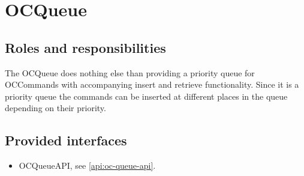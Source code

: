 \section{OCQueue}
\label{element:oc-queue}

\subsection{Roles and responsibilities}

\npar The OCQueue does nothing else than providing a priority queue for
OCCommands with accompanying insert and retrieve functionality. Since
it is a priority queue the commands can be inserted at different places in
the queue depending on their priority. 

\subsection{Provided interfaces}

\begin{itemize}
  \item OCQueueAPI, see \ref{api:oc-queue-api}.
\end{itemize}